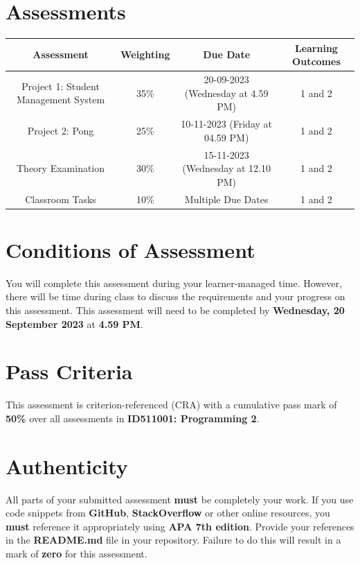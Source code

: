 \documentclass{article}
\begin{document}
\section*{Assessments}
\renewcommand{\arraystretch}{1.5}
\begin{tabular}{|c|c|c|c|}
	\hline
	\textbf{Assessment}                                 & \textbf{Weighting} & \textbf{Due Date}            & \textbf{Learning Outcomes} \\ \hline
	\small Project 1: Student Management System  & \small 35\%        & \small 20-09-2023 (Wednesday at 4.59 PM)   & \small 1 and 2                   \\ \hline
	\small Project 2: Pong & \small 25\%        & \small 10-11-2023 (Friday at 04.59 PM)  & \small 1 and 2                   \\ \hline
	\small Theory Examination                        & \small 30\%        & \small 15-11-2023 (Wednesday at 12.10 PM)  & \small 1 and 2                   \\ \hline
	\small Classroom Tasks                       & \small 10\%        & \small Multiple Due Dates  & \small 1 and 2                   \\ \hline
\end{tabular} 


\section*{Conditions of Assessment}
You will complete this assessment during your learner-managed time. However, there will be time during class to discuss the requirements and your progress on this assessment. This assessment will need to be completed by \textbf{Wednesday, 20 September 2023} at \textbf{4.59 PM}.

\section*{Pass Criteria}
This assessment is criterion-referenced (CRA) with a cumulative pass mark of \textbf{50\%} over all assessments in \textbf{ID511001: Programming 2}.

\section*{Authenticity}
All parts of your submitted assessment \textbf{must} be completely your work. If you use code snippets from \textbf{GitHub}, \textbf{StackOverflow} or other online resources, you \textbf{must} reference it appropriately using \textbf{APA 7th edition}. Provide your references in the \textbf{README.md} file in your repository. Failure to do this will result in a mark of \textbf{zero} for this assessment. 
\end{document}
